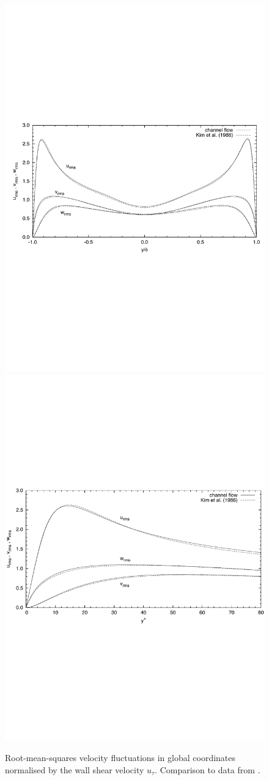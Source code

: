\documentclass[11pt]{report}
\begin{document}
\begin{figure}
\begin{center}
\includegraphics[width=0.7\linewidth]{dns_rms_global}\\
\includegraphics[width=0.67\linewidth]{dns_rms_wall}
\end{center}
\caption{ Root-mean-squares velocity fluctuations in global
  coordinates normalised by the wall shear velocity
  $u_{\tau}$. Comparison to data from \citet{kmm87}.}
\label{pic:rms_global}
\end{figure}


\clearpage
{}



\end{document}
